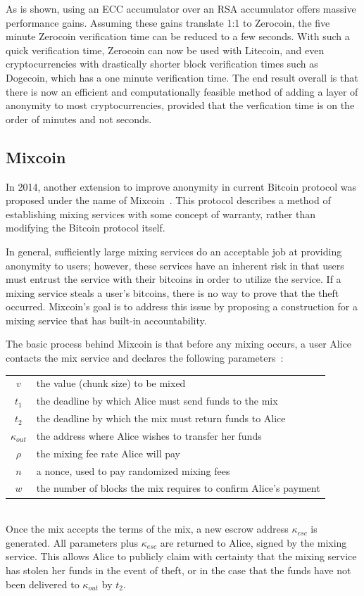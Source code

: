 \documentclass[11pt]{article}
\begin{document}
As is shown, using an ECC accumulator over an RSA accumulator offers massive performance gains. Assuming these gains
translate 1:1 to Zerocoin, the five minute Zerocoin verification time can be reduced to a few seconds. With such a quick
verification time, Zerocoin can now be used with Litecoin, and even cryptocurrencies with drastically shorter block
verification times such as Dogecoin, which has a one minute verification time. The end result overall is that there is
now an efficient and computationally feasible method of adding a layer of anonymity to most cryptocurrencies, provided
that the verfication time is on the order of minutes and not seconds.

\subsection{Mixcoin}
In 2014, another extension to improve anonymity in current Bitcoin protocol was proposed under the name of
Mixcoin~\cite{bonneau14}. This protocol describes a method of establishing mixing services with some concept of
warranty, rather than modifying the Bitcoin protocol itself.

In general, sufficiently large mixing services do an acceptable job at providing anonymity to users; however, these
services have an inherent risk in that users must entrust the service with their bitcoins in order to utilize the
service.  If a mixing service steals a user's bitcoins, there is no way to prove that the theft occurred. Mixcoin's goal
is to address this issue by proposing a construction for a mixing service that has built-in accountability.

The basic process behind Mixcoin is that before any mixing occurs, a user Alice contacts the mix service and declares
the following parameters~\cite{bonneau14}:\\
\begin{tabular}{cl}
    $v$ & the value (chunk size) to be mixed\\
    $t_1$ & the deadline by which Alice must send funds to the mix\\
    $t_2$ & the deadline by which the mix must return funds to Alice\\
    $\kappa_{out}$ & the address where Alice wishes to transfer her funds\\
    $\rho$ & the mixing fee rate Alice will pay\\
    $n$ & a nonce, used to pay randomized mixing fees\\
    $w$ & the number of blocks the mix requires to confirm Alice's payment
\end{tabular}
\vspace{1em}\\ 
Once the mix accepts the terms of the mix, a new escrow address $\kappa_{esc}$ is generated. All parameters plus
$\kappa_{esc}$ are returned to Alice, signed by the mixing service. This allows Alice to publicly claim with certainty
that the mixing service has stolen her funds in the event of theft, or in the case that the funds have not been
delivered to $\kappa_{out}$ by $t_2$.
\end{document}
